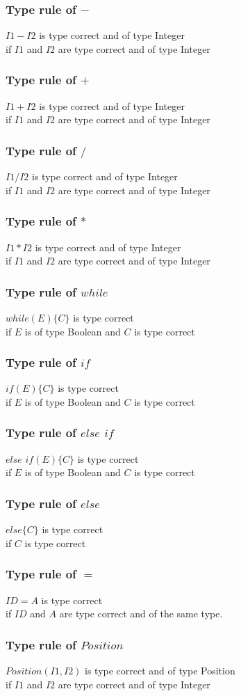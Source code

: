 	\subsubsection*{Type rule of $-$}
		$I1 - I2$ is type correct and of type Integer\\
		if $I1$ and $I2$ are type correct and of type Integer
	\subsubsection*{Type rule of $+$}
		$I1 + I2$ is type correct and of type Integer\\
		if $I1$ and $I2$ are type correct and of type Integer
	\subsubsection*{Type rule of $/$}
		$I1 / I2$ is type correct and of type Integer\\
		if $I1$ and $I2$ are type correct and of type Integer
	\subsubsection*{Type rule of $*$}
		$I1 * I2$ is type correct and of type Integer\\
		if $I1$ and $I2$ are type correct and of type Integer
	\subsubsection*{Type rule of $while$}
		$while(E)\{C\}$ is type correct\\
		if $E$ is of type Boolean and $C$ is type correct
	\subsubsection*{Type rule of $if$}
		$if(E)\{C\}$ is type correct\\
		if $E$ is of type Boolean and $C$ is type correct
	\subsubsection*{Type rule of $else$ $if$}
		$else$ $if(E)\{C\}$ is type correct\\
		if $E$ is of type Boolean and $C$ is type correct
	\subsubsection*{Type rule of $else$}
		$else\{C\}$ is type correct\\
		if $C$ is type correct
	\subsubsection*{Type rule of $=$}
		$ID = A$ is type correct\\
		if $ID$ and $A$ are type correct and of the same type.
	\subsubsection*{Type rule of $Position$}
		$Position(I1,I2)$ is type correct and of type Position\\
		if $I1$ and $I2$ are type correct and of type Integer
	